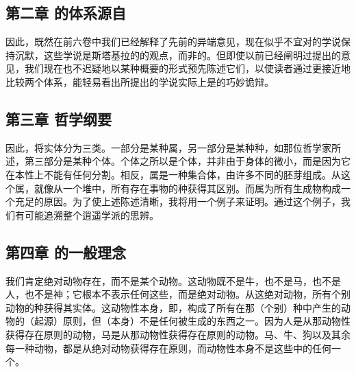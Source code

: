 
\subsection{第二章 的体系源自}

因此，既然在前六卷中我们已经解释了先前的异端意见，现在似乎不宜对的学说保持沉默，这些学说是斯塔基拉的的观点，而非的。但即使以前已经阐明过提出的意见，我们现在也不迟疑地以某种概要的形式预先陈述它们，以使读者通过更接近地比较两个体系，能轻易看出所提出的学说实际上是的巧妙诡辩。\par


\subsection{第三章 哲学纲要}

因此，将实体分为三类。一部分是某种属，另一部分是某种种，如那位哲学家所述，第三部分是某种个体。个体之所以是个体，并非由于身体的微小，而是因为它在本性上不能有任何分割。相反，属是一种集合体，由许多不同的胚芽组成。从这个属，就像从一个堆中，所有存在事物的种获得其区别。而属为所有生成物构成一个充足的原因。为了使上述陈述清晰，我将用一个例子来证明。通过这个例子，我们有可能追溯整个逍遥学派的思辨。\par


\subsection{第四章 的一般理念}

我们肯定绝对动物存在，而不是某个动物。这动物既不是牛，也不是马，也不是人，也不是神；它根本不表示任何这些，而是绝对动物。从这绝对动物，所有个别动物的种获得其实体。这动物性本身，即，构成了所有在那（个别）种中产生的动物的（起源）原则，但（本身）不是任何被生成的东西之一。因为人是从那动物性获得存在原则的动物，马是从那动物性获得存在原则的动物。马、牛、狗以及其余每一种动物，都是从绝对动物获得存在原则，而动物性本身不是这些中的任何一个。\par

